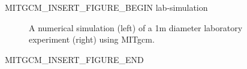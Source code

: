 \begin{rawhtml}MITGCM_INSERT_FIGURE_BEGIN lab-simulation\end{rawhtml}
\begin{figure}
\caption{A numerical simulation (left) of a 1m diameter laboratory
experiment (right) using MITgcm.}
\label{fig:lab-simulation}
\end{figure}
\begin{rawhtml}MITGCM_INSERT_FIGURE_END\end{rawhtml}
